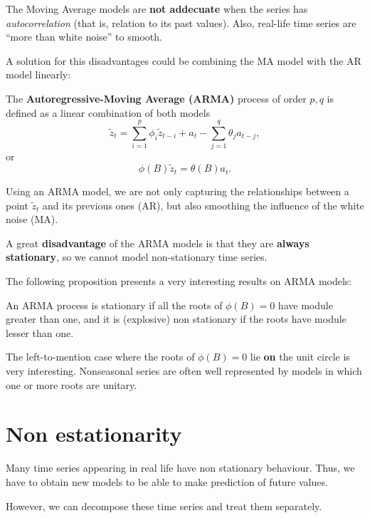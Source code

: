 The Moving Average models are \textbf{not addecuate} when the series has \emph{autocorrelation} (that is, relation to its past values). Also, real-life time series are ``more than white noise'' to smooth.

A solution for this disadvantages could be combining the MA model with the AR model linearly:

\begin{ndef}
The \textbf{Autoregressive-Moving Average (ARMA)} process of order \(p,q\) is defined as a linear combination of both models
\[
\tilde z_t = \sum_{i = 1}^p \phi_i \tilde z_{t-i} + a_t - \sum_{j = 1}^q \theta_j a_{t-j}, 
\]
or 
\[
\phi(B)\tilde z_t = \theta(B)a_t. 
\]
\end{ndef}

Using an ARMA model, we are not only capturing the relationships between a point \(\tilde z_t\) and its previous ones (AR), but also smoothing the influence of the white noise (MA).

A great \textbf{disadvantage} of the ARMA models is that they are \textbf{always stationary}, so we cannot model non-stationary time series.

The following proposition presents a very interesting results on ARMA models:

\begin{nprop}
  An ARMA process is stationary if all the roots of \(\phi(B) = 0\) have module greater than one, and it is (explosive) non stationary if the roots have module lesser than one.

\end{nprop}

The left-to-mention case where the roots of \(\phi(B) = 0\) lie \textbf{on} the unit circle is very interesting. Nonseasonal series are often well represented by models in which one or more roots are unitary.
\section{Non estationarity}

Many time series appearing in real life have non stationary behaviour. Thus, we have to obtain new models to be able to make prediction of future values.

However, we can decompose these time series and treat them separately. 

